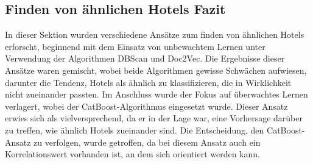\subsection{Finden von ähnlichen Hotels Fazit}
\label{subsec:similar_fazit}
In dieser Sektion wurden verschiedene Ansätze zum finden von ähnlichen Hotels erforscht, beginnend mit dem Einsatz von unbewachtem Lernen unter Verwendung der Algorithmen DBScan und Doc2Vec. Die Ergebnisse dieser Ansätze waren gemischt, wobei beide Algorithmen gewisse Schwächen aufwiesen, darunter die Tendenz, Hotels als ähnlich zu klassifizieren, die in Wirklichkeit nicht zueinander passten.
\newline
\newline
Im Anschluss wurde der Fokus auf überwachtes Lernen verlagert, wobei der CatBoost-Algorithmus eingesetzt wurde. Dieser Ansatz erwies sich als vielversprechend, da er in der Lage war, eine Vorhersage darüber zu treffen, wie ähnlich Hotels zueinander sind. Die Entscheidung, den CatBoost-Ansatz zu verfolgen, wurde getroffen, da bei diesem Ansatz auch ein Korrelationswert vorhanden ist, an dem sich orientiert werden kann.